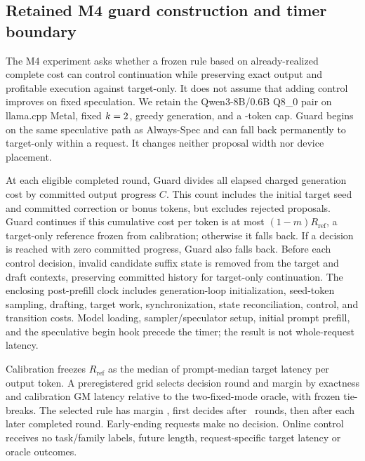 \subsection{Retained M4 guard construction and timer boundary}
The M4 experiment asks whether a frozen rule based on already-realized complete cost can control continuation while preserving exact output and profitable execution against target-only. It does not assume that adding control improves on fixed speculation. We retain the Qwen3-8B/0.6B Q8\_0 pair on llama.cpp Metal, fixed $k=2$, greedy generation, and a \RTCap-token cap. Guard begins on the same speculative path as Always-Spec and can fall back permanently to target-only within a request. It changes neither proposal width nor device placement.

At each eligible completed round, Guard divides all elapsed charged generation cost by committed output progress $C$. This count includes the initial target seed and committed correction or bonus tokens, but excludes rejected proposals. Guard continues if this cumulative cost per token is at most $(1-m)R_{\mathrm{ref}}$, a target-only reference frozen from calibration; otherwise it falls back. If a decision is reached with zero committed progress, Guard also falls back. Before each control decision, invalid candidate suffix state is removed from the target and draft contexts, preserving committed history for target-only continuation. The enclosing post-prefill clock includes generation-loop initialization, seed-token sampling, drafting, target work, synchronization, state reconciliation, control, and transition costs. Model loading, sampler/speculator setup, initial prompt prefill, and the speculative begin hook precede the timer; the result is not whole-request latency.

Calibration freezes $R_{\mathrm{ref}}$ as the median of prompt-median target latency per output token. A preregistered grid selects decision round and margin by exactness and calibration GM latency relative to the two-fixed-mode oracle, with frozen tie-breaks. The selected rule has margin \RTMargin, first decides after \RTRounds\ rounds, then after each later completed round. Early-ending requests make no decision. Online control receives no task/family labels, future length, request-specific target latency or oracle outcomes.

